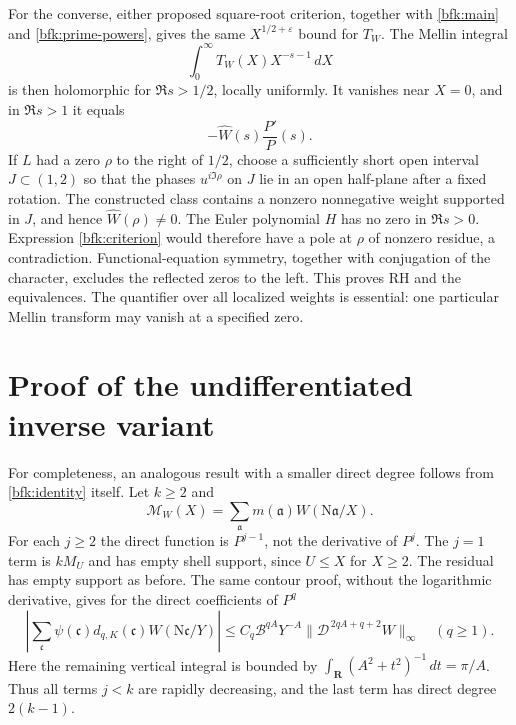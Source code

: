 For the converse, either proposed square-root criterion,
together with \eqref{bfk:main} and \eqref{bfk:prime-powers},
gives the same \(X^{1/2+\varepsilon}\) bound for \(T_W\).
The Mellin integral
\[
 \int_0^\infty T_W(X)X^{-s-1}\,dX
\]
is then holomorphic for \(\Re s>1/2\), locally uniformly.
It vanishes near \(X=0\), and in \(\Re s>1\) it equals
\begin{equation}
 -\widehat W(s)\frac{P'}{P}(s).
 \label{bfk:criterion}
\end{equation}
If \(L\) had a zero \(\rho\) to the right of \(1/2\), choose
a sufficiently short open interval \(J\subset(1,2)\) so that
the phases \(u^{i\Im\rho}\) on \(J\) lie in an open half-plane
after a fixed rotation.
The constructed class contains a nonzero nonnegative weight
supported in \(J\), and hence \(\widehat W(\rho)\ne0\).
The Euler polynomial \(H\) has no zero in \(\Re s>0\).
Expression \eqref{bfk:criterion} would therefore have a pole
at \(\rho\) of nonzero residue, a contradiction.
Functional-equation symmetry, together with conjugation of
the character, excludes the reflected zeros to the left.
This proves RH and the equivalences.
The quantifier over all localized weights is essential:
one particular Mellin transform may vanish at a specified zero.

\section{Proof of the undifferentiated inverse variant}

For completeness, an analogous result with a smaller direct
degree follows from \eqref{bfk:identity} itself.
Let \(k\ge2\) and
\[
 \mathcal M_W(X)=\sum_{\mathfrak a}
             m(\mathfrak a)W(\mathrm N\mathfrak a/X).
\]
For each \(j\ge2\) the direct function is \(P^{j-1}\), not
the derivative of \(P^j\).
The \(j=1\) term is \(kM_U\) and has empty shell support,
since \(U\le X\) for \(X\ge2\).
The residual has empty support as before.
The same contour proof, without the logarithmic derivative,
gives for the direct coefficients of \(P^q\)
\begin{equation}
 \left|\sum_{\mathfrak c}\psi(\mathfrak c)d_{q,K}(\mathfrak c)
                    W(\mathrm N\mathfrak c/Y)\right|
 \le C_q\mathcal B^{qA}Y^{-A}
               \|\mathcal D^{\,2qA+q+2}W\|_\infty
 \quad(q\ge1).
 \label{bfk:inverse-direct}
\end{equation}
Here the remaining vertical integral is bounded by
\(\int_{\mathbf R}(A^2+t^2)^{-1}\,dt=\pi/A\).
Thus all terms \(j<k\) are rapidly decreasing, and the last
term has direct degree \(2(k-1)\).

